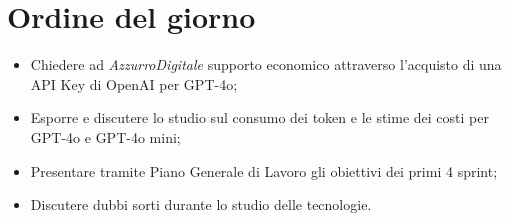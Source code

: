 

\section{Ordine del giorno}

\begin{itemize}
    \item Chiedere ad \emph{AzzurroDigitale} supporto economico attraverso l'acquisto di una API Key di OpenAI per GPT-4o;
    \item Esporre e discutere lo studio sul consumo dei token e le stime dei costi per GPT-4o e GPT-4o mini;
    \item Presentare tramite Piano Generale di Lavoro gli obiettivi dei primi 4 sprint;
    \item Discutere dubbi sorti durante lo studio delle tecnologie.
\end{itemize}

